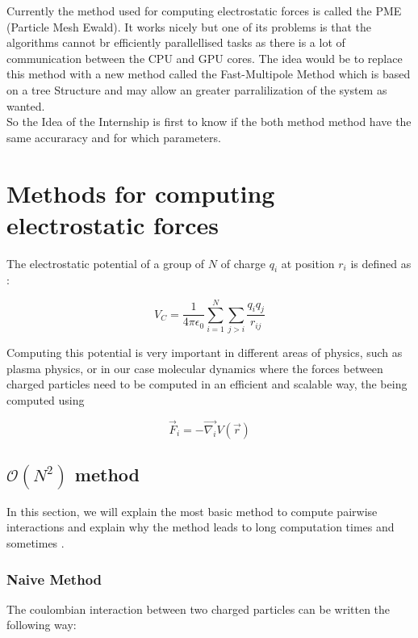 \documentclass[10pt,twoside,a4paper]{report}
\begin{document}
Currently the method used for computing electrostatic forces is called the PME (Particle Mesh Ewald). It works nicely but one of its problems is that the algorithms cannot br efficiently parallellised tasks as there is a lot of communication between the CPU and GPU cores. The idea would be to replace this method with a new method called the Fast-Multipole Method which is based on a tree Structure and may allow an greater parralilization of the system as wanted.\\

So the Idea of the Internship is first to know if the both method method have the same accuraracy and for which parameters.


\chapter{Methods for computing electrostatic forces}

The electrostatic potential of a group of $N$ of charge $q_i$ at position $r_i$ is defined as :

\begin{equation}
V_C = \frac{1}{4\pi\epsilon_0} \sum\limits_{i=1}^{N}\sum\limits_{j>i} \frac{q_i q_j}{r_{ij}}
\end{equation}

Computing this potential is very important in different areas of physics, such as plasma physics, or in our case molecular dynamics where the forces between charged particles need to be computed in an efficient and scalable way, the being computed using

\begin{equation}
	\vec{F}_i = - \vec{\nabla_i} V(\vec{r})
\end{equation}


\section{$\mathcal{O}(N^2)$ method }


In this section, we will explain the most basic method to compute pairwise interactions and explain why the method leads to long computation times and sometimes .

\subsection{Naive Method}

The coulombian interaction between two charged particles can be written the following way:
\end{document}
